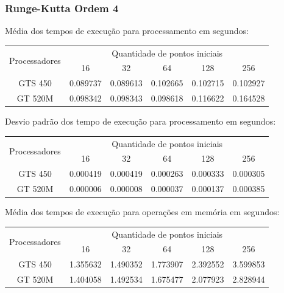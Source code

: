     \subsubsection{Runge-Kutta Ordem 4} 
    Média dos tempos de execução para processamento em segundos:\\
    \begin{tabular}{| c | c | c | c | c | c |}
      \hline
      \multirow{2}{*}{Processadores}& \multicolumn{5}{|c|}{Quantidade de pontos iniciais} \\ \cline{2-6}
      & 16 & 32 & 64 & 128 & 256 \\ \hline
      GTS 450 & 0.089737 & 0.089613 & 0.102665 & 0.102715 & 0.102927\\ \hline
      GT 520M & 0.098342 & 0.098343 & 0.098618 & 0.116622 & 0.164528\\ \hline

      \hline
    \end{tabular}
    
    \hspace{1mm}\newline
    
    \noindent Desvio padrão dos tempo de execução para processamento em segundos:\\
    \begin{tabular}{| c | c | c | c | c | c |}
      \hline
      \multirow{2}{*}{Processadores}& \multicolumn{5}{|c|}{Quantidade de pontos iniciais} \\ \cline{2-6}
      & 16 & 32 & 64 & 128 & 256 \\ \hline
      GTS 450 & 0.000419 & 0.000419 & 0.000263 & 0.000333 & 0.000305 \\ \hline
      GT 520M & 0.000006 & 0.000008 & 0.000037 & 0.000137 & 0.000385 \\ \hline

      \hline
    \end{tabular}
    
    \hspace{1mm}\newline
    
    \noindent Média dos tempos de execução para operações em memória em segundos:\\
    \begin{tabular}{| c | c | c | c | c | c |}
      \hline
      \multirow{2}{*}{Processadores}& \multicolumn{5}{|c|}{Quantidade de pontos iniciais} \\ \cline{2-6}
      & 16 & 32 & 64 & 128 & 256 \\ \hline
      GTS 450 & 1.355632 & 1.490352 & 1.773907 & 2.392552 & 3.599853\\ \hline
      GT 520M & 1.404058 & 1.492534 & 1.675477 & 2.077923 & 2.828944\\ \hline

      \hline
    \end{tabular}
    
